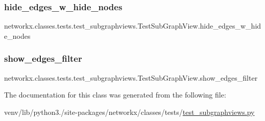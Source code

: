 \subsubsection{\texorpdfstring{hide\+\_\+edges\+\_\+w\+\_\+hide\+\_\+nodes}{hide\_edges\_w\_hide\_nodes}}
{\footnotesize\ttfamily networkx.\+classes.\+tests.\+test\+\_\+subgraphviews.\+Test\+Sub\+Graph\+View.\+hide\+\_\+edges\+\_\+w\+\_\+hide\+\_\+nodes}

\mbox{\label{classnetworkx_1_1classes_1_1tests_1_1test__subgraphviews_1_1TestSubGraphView_ad14afbba3b1c02ada76ed5313894ea24}} 
\subsubsection{\texorpdfstring{show\+\_\+edges\+\_\+filter}{show\_edges\_filter}}
{\footnotesize\ttfamily networkx.\+classes.\+tests.\+test\+\_\+subgraphviews.\+Test\+Sub\+Graph\+View.\+show\+\_\+edges\+\_\+filter\hspace{0.3cm}{\ttfamily [static]}}



The documentation for this class was generated from the following file\+:\begin{DoxyCompactItemize}
\item 
venv/lib/python3./site-\/packages/networkx/classes/tests/\hyperlink{test__subgraphviews_8py}{test\+\_\+subgraphviews.\+py}\end{DoxyCompactItemize}
